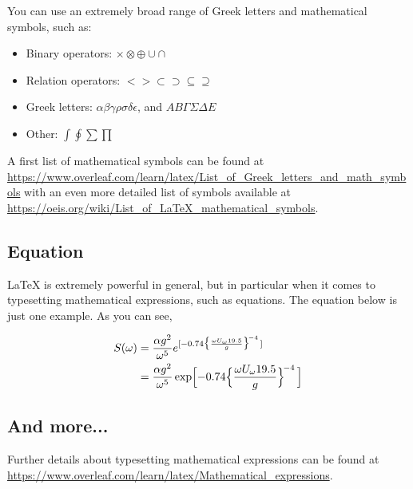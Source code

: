 You can use an extremely broad range of Greek letters and mathematical symbols, such as:
\begin{itemize}[nosep]
  \item Binary operators: $\times \otimes \oplus \cup \cap$ 
  \item Relation operators: $< > \subset \supset \subseteq \supseteq$
  \item Greek letters: $\alpha \beta \gamma \rho \sigma \delta \epsilon$, and $A B \Gamma \Sigma \Delta E$
  \item Other: $\int \oint \sum \prod$
\end{itemize}
%
A first list of mathematical symbols can be found at \url{https://www.overleaf.com/learn/latex/List_of_Greek_letters_and_math_symbols} with an even more detailed list of symbols available at \url{https://oeis.org/wiki/List_of_LaTeX_mathematical_symbols}.


\subsection{Equation}
\label{sec:MathEquations}

\LaTeX{} is extremely powerful in general, but in particular when it comes to typesetting mathematical expressions, such as equations. 
The equation below is just one example. 
As you can see, 

\begin{align}\label{eq:MyEquation}
\begin{split}
S(\omega) 
&= \frac{\alpha g^2}{\omega^5} e^{[ -0.74\bigl\{\frac{\omega U_\omega 19.5}{g}\bigr\}^{\!-4}\,]} \\
&= \frac{\alpha g^2}{\omega^5} \exp\Bigl[ -0.74\Bigl\{\frac{\omega U_\omega 19.5}{g}\Bigr\}^{\!-4}\,\Bigr] 
\end{split}
\end{align}


\subsection{And more...}
\label{sec:MathMore}

Further details about typesetting mathematical expressions can be found at \url{https://www.overleaf.com/learn/latex/Mathematical_expressions}.




